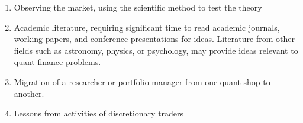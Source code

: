 \documentclass[a4paper,oneside,openany]{book}
\begin{document}
\begin{remark} 
\begin{enumerate}[label=\arabic*.]
\setlength{\itemsep}{0pt}
\item Observing the market, using the scientific method to test the theory
\item Academic literature, requiring significant time to read academic journals, working papers, and conference presentations for ideas. Literature from other fields such as astronomy, physics, or psychology, may provide ideas relevant to quant finance problems.
\item Migration of a researcher or portfolio manager from one quant shop to another.
\item Lessons from activities of discretionary traders
\end{enumerate}
\end{remark}
\end{document}
